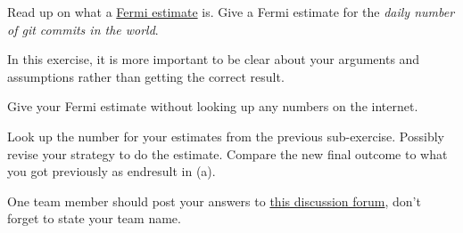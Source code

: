 \documentclass[a4paper,10pt,landscape,twocolumn]{scrartcl}
\begin{document}
%







\begin{exercise}
Read up on what a
\href{https://en.wikipedia.org/wiki/Fermi_problem}{Fermi estimate}
is. Give a Fermi estimate for the \emph{daily number of git commits
in the world}.
 
In this exercise, it is more important to be clear about your
arguments and assumptions rather than getting the correct result.

\begin{subex}[(4pt)]
Give your Fermi estimate without looking up any numbers on the internet.
\end{subex}

\begin{subex}[(4pt)]
Look up the number for your estimates from the previous
sub-exercise. Possibly revise your strategy to do the
estimate. Compare the new final outcome to what you got previously as
endresult in (a).
\end{subex}

One team member should post your answers to
\href{https://canvas.uva.nl/courses/2205/discussion_topics/23268}{this
  discussion forum}, don't forget to state your team name.
\end{exercise}
\end{document}

